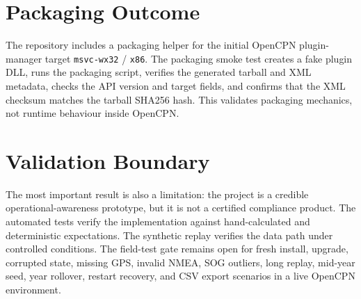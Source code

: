 \section{Packaging Outcome}
The repository includes a packaging helper for the initial OpenCPN plugin-manager target \texttt{msvc-wx32} / \texttt{x86}. The packaging smoke test creates a fake plugin DLL, runs the packaging script, verifies the generated tarball and XML metadata, checks the API version and target fields, and confirms that the XML checksum matches the tarball SHA256 hash. This validates packaging mechanics, not runtime behaviour inside OpenCPN.

\section{Validation Boundary}
The most important result is also a limitation: the project is a credible operational-awareness prototype, but it is not a certified compliance product. The automated tests verify the implementation against hand-calculated and deterministic expectations. The synthetic replay verifies the data path under controlled conditions. The field-test gate remains open for fresh install, upgrade, corrupted state, missing GPS, invalid NMEA, SOG outliers, long replay, mid-year seed, year rollover, restart recovery, and CSV export scenarios in a live OpenCPN environment.
